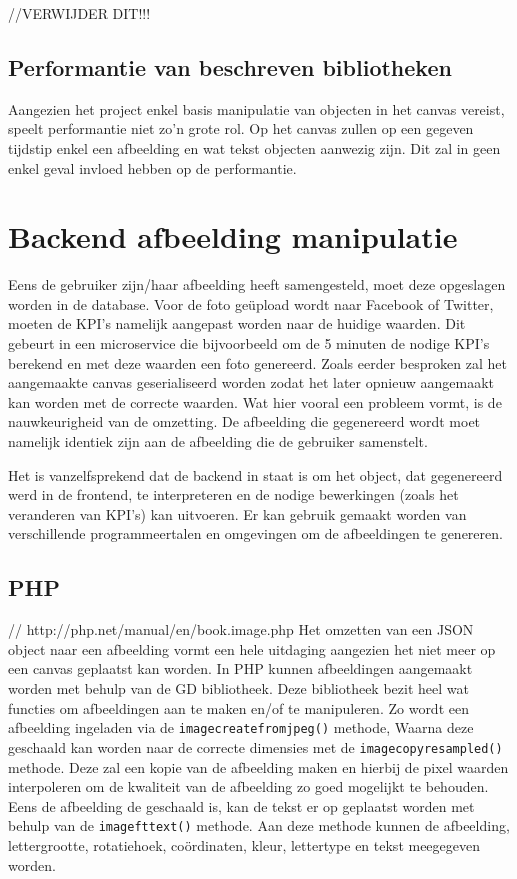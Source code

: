 //VERWIJDER DIT!!!
\subsection{Performantie van beschreven bibliotheken}
Aangezien het project enkel basis manipulatie van objecten in het canvas vereist, speelt performantie niet zo'n grote rol. Op het canvas zullen op een gegeven tijdstip enkel een afbeelding en wat tekst objecten aanwezig zijn. Dit zal in geen enkel geval invloed hebben op de performantie. 


\newpage
\section{Backend afbeelding manipulatie}
Eens de gebruiker zijn/haar afbeelding heeft samengesteld, moet deze opgeslagen worden in de database. Voor de foto ge\"{u}pload wordt naar Facebook of Twitter, moeten de KPI's namelijk aangepast worden naar de huidige waarden. Dit gebeurt in een microservice die bijvoorbeeld om de 5 minuten de nodige KPI's berekend en met deze waarden een foto genereerd. Zoals eerder besproken zal het aangemaakte canvas geserialiseerd worden zodat het later opnieuw aangemaakt kan worden met de correcte waarden. Wat hier vooral een probleem vormt, is de nauwkeurigheid van de omzetting. De afbeelding die gegenereerd wordt moet namelijk identiek zijn aan de afbeelding die de gebruiker samenstelt. 

Het is vanzelfsprekend dat de backend in staat is om het object, dat gegenereerd werd in de frontend, te interpreteren en de nodige bewerkingen (zoals het veranderen van KPI's) kan uitvoeren. Er kan gebruik gemaakt worden van verschillende programmeertalen en omgevingen om de afbeeldingen te genereren. 

\subsection{PHP} // http://php.net/manual/en/book.image.php
Het omzetten van een JSON object naar een afbeelding vormt een hele uitdaging aangezien het niet meer op een canvas geplaatst kan worden. In PHP kunnen afbeeldingen aangemaakt worden met behulp van de GD bibliotheek. Deze bibliotheek bezit heel wat functies om afbeeldingen aan te maken en/of te manipuleren. Zo wordt een afbeelding ingeladen via de \lstinline{imagecreatefromjpeg()} methode, Waarna deze geschaald kan worden naar de correcte dimensies met de \lstinline{imagecopyresampled()} methode. Deze zal een kopie van de afbeelding maken en hierbij de pixel waarden interpoleren om de kwaliteit van de afbeelding zo goed mogelijkt te behouden. Eens de afbeelding de geschaald is, kan de tekst er op geplaatst worden met behulp van de \lstinline{imagefttext()} methode. Aan deze methode kunnen de afbeelding, lettergrootte, rotatiehoek, co\"{o}rdinaten, kleur, lettertype en tekst meegegeven worden. 

